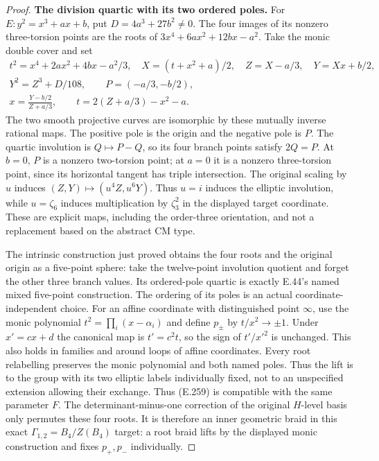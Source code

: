 \begin{proof}
\par\medskip\noindent\textbf{The division quartic with its two ordered poles.}\quad
For $E:y^2=x^3+ax+b$, put $D=4a^3+27b^2\ne0$.
The four images of its nonzero three-torsion points are the
roots of $3x^4+6ax^2+12bx-a^2$.
Take the monic double cover and set
\[
\begin{gathered}
 t^2=x^4+2ax^2+4bx-a^2/3,
 \quad X=(t+x^2+a)/2,\quad Z=X-a/3,\quad Y=Xx+b/2,\\
 Y^2=Z^3+D/108,
 \qquad P=(-a/3,-b/2),\\
 x=\frac{Y-b/2}{Z+a/3},\qquad
 t=2(Z+a/3)-x^2-a.
\end{gathered}                                                   \tag{E.259}
\]
The two smooth projective curves are isomorphic by these
mutually inverse rational maps.  The positive pole is the
origin and the negative pole is $P$.  The quartic involution
is $Q\mapsto P-Q$, so its four branch points satisfy
$2Q=P$.  At $b=0$, $P$ is a nonzero two-torsion point;
at $a=0$ it is a nonzero three-torsion point, since its
horizontal tangent has triple intersection.
The original scaling by $u$ induces
$(Z,Y)\mapsto(u^4Z,u^6Y)$.  Thus $u=i$ induces the elliptic
involution, while $u=\zeta_6$ induces multiplication by
$\zeta_3^2$ in the displayed target coordinate.
These are explicit maps, including the order-three
orientation, and not a replacement based on the abstract
CM type.

The intrinsic construction just proved obtains the four
roots and the original origin as a five-point sphere:
take the twelve-point involution quotient and forget the
other three branch values.  Its ordered-pole quartic is
exactly E.44's named mixed five-point construction.
The ordering of its poles is an actual coordinate-independent
choice.  For an affine coordinate with distinguished point
$\infty$, use the monic polynomial
$t^2=\prod_i(x-\alpha_i)$ and define $p_\pm$ by
$t/x^2\to\pm1$.  Under $x'=cx+d$ the canonical map is
$t'=c^2t$, so the sign of $t'/x'^2$ is unchanged.
This also holds in families and around loops of affine
coordinates.  Every root relabelling preserves the monic
polynomial and both named poles.  Thus the lift is to the
group with its two elliptic labels individually fixed,
not to an unspecified extension allowing their exchange.
Thus (E.259) is compatible with the same parameter $F$.
The determinant-minus-one correction of the original
$H$-level basis only permutes these four roots.  It is
therefore an inner geometric braid in this exact
$\Gamma_{1,2}=B_4/Z(B_4)$ target: a root braid lifts by
the displayed monic construction and fixes $p_+,p_-$
individually.


\end{proof}

